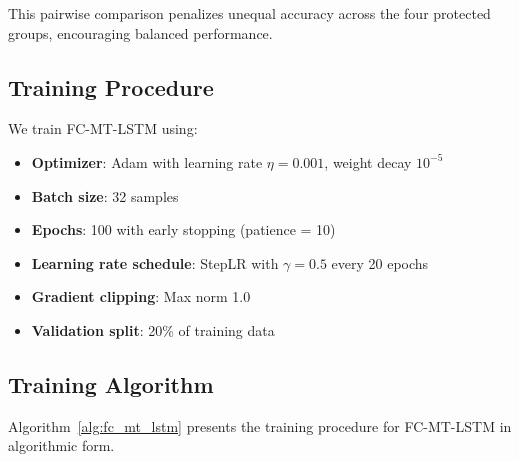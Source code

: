 \documentclass[conference]{IEEEtran}
\newcommand{\modelname}{FC-MT-LSTM}
\begin{document}
This pairwise comparison penalizes unequal accuracy across the four protected groups, encouraging balanced performance.

\subsection{Training Procedure}

We train \modelname{} using:
\begin{itemize}
    \item \textbf{Optimizer}: Adam with learning rate $\eta = 0.001$, weight decay $10^{-5}$
    \item \textbf{Batch size}: 32 samples
    \item \textbf{Epochs}: 100 with early stopping (patience = 10)
    \item \textbf{Learning rate schedule}: StepLR with $\gamma = 0.5$ every 20 epochs
    \item \textbf{Gradient clipping}: Max norm 1.0
    \item \textbf{Validation split}: 20\% of training data
\end{itemize}

\subsection{Training Algorithm}

Algorithm~\ref{alg:fc_mt_lstm} presents the training procedure for FC-MT-LSTM in algorithmic form.
\end{document}
